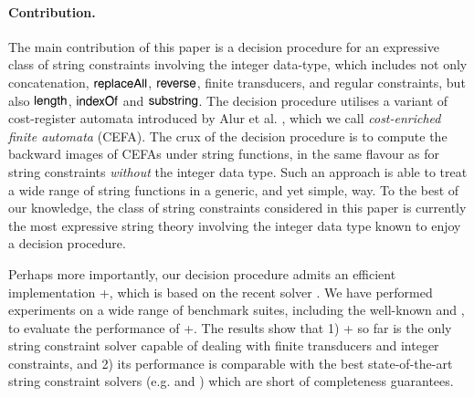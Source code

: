 \paragraph*{Contribution.} The main contribution of this paper is a decision procedure for an expressive class of string constraints involving the integer data-type, which includes not only concatenation, $\mathsf{replaceAll}$, $\mathsf{reverse}$, finite transducers, and regular constraints, but also $\mathsf{length}$, $\mathsf{indexOf}$ and $\mathsf{substring}$. The decision procedure utilises a variant of cost-register automata introduced by Alur et al. \cite{RLJ+13}, which we call \emph{cost-enriched finite automata} (CEFA). The crux of the decision procedure is to compute the backward images of CEFAs under string functions,  in the same flavour as \cite{CHL+19} for string constraints \emph{without} the integer data type. Such an approach %
is able to treat %
a wide range of string functions in a generic, and yet simple, way. To the best of our knowledge, the class of string constraints considered in this paper is currently the most expressive string theory involving the integer data type known to enjoy a decision procedure.

Perhaps more importantly, our decision procedure admits an efficient implementation {\ostrich}+, which is based on %
the recent {\ostrich} solver \cite{CHL+19}.  We have performed experiments on a wide range of benchmark suites, including the well-known {\kaluzabench} and {\pyexbench}, to evaluate the performance of {\ostrich}+. The results show that  %
1) {\ostrich}+ so far is the only string constraint solver capable of dealing with finite transducers and integer constraints, and 2) its performance is comparable with the best state-of-the-art string constraint solvers (e.g. {\cvc} and {\zthreetrau}) which are short of completeness guarantees. 




